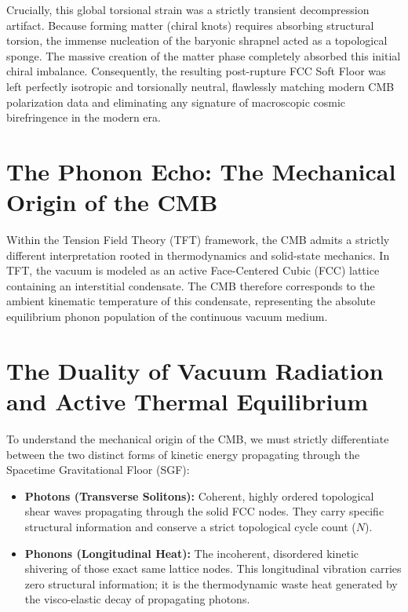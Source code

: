 Crucially, this global torsional strain was a strictly transient decompression artifact. Because forming matter (chiral knots) requires absorbing structural torsion, the immense nucleation of the baryonic shrapnel acted as a topological sponge. The massive creation of the matter phase completely absorbed this initial chiral imbalance. Consequently, the resulting post-rupture FCC Soft Floor was left perfectly isotropic and torsionally neutral, flawlessly matching modern CMB polarization data and eliminating any signature of macroscopic cosmic birefringence in the modern era.

\section{The Phonon Echo: The Mechanical Origin of the CMB}
\label{sec:phonon_echo_cmb}

Within the Tension Field Theory (TFT) framework, the CMB admits a strictly different interpretation rooted in thermodynamics and solid-state mechanics. In TFT, the vacuum is modeled as an active Face-Centered Cubic (FCC) lattice containing an interstitial condensate. The CMB therefore corresponds to the ambient kinematic temperature of this condensate, representing the absolute equilibrium phonon population of the continuous vacuum medium.

\section{The Duality of Vacuum Radiation and Active Thermal Equilibrium}
\label{sec:vacuum_radiation_duality}

To understand the mechanical origin of the CMB, we must strictly differentiate between the two distinct forms of kinetic energy propagating through the Spacetime Gravitational Floor (SGF):

\begin{itemize}
    \item \textbf{Photons (Transverse Solitons):} Coherent, highly ordered topological shear waves propagating through the solid FCC nodes. They carry specific structural information and conserve a strict topological cycle count ($N$).
    \item \textbf{Phonons (Longitudinal Heat):} The incoherent, disordered kinetic shivering of those exact same lattice nodes. This longitudinal vibration carries zero structural information; it is the thermodynamic waste heat generated by the visco-elastic decay of propagating photons.
\end{itemize}

